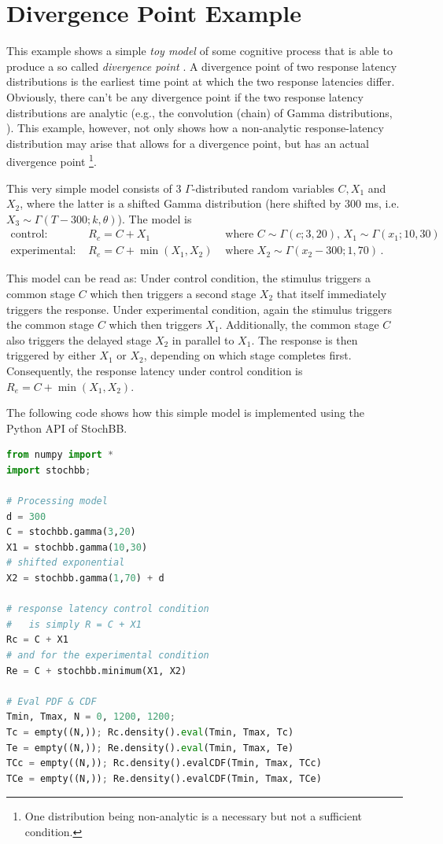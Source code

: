 \section{Divergence Point Example}
This example shows a simple \emph{toy model} of some cognitive process that is able to produce a
so called \emph{divergence point} \cite{Reingold2012}. A divergence point of two response latency
distributions is the earliest time point at which the two response latencies differ. Obviously, 
there can't be any divergence point if the two response latency distributions are analytic 
(e.g., the convolution (chain) of Gamma distributions, \cite{Gelooven1999}). This example, however,
not only shows how a non-analytic response-latency distribution may arise that allows for a 
divergence point, but has an actual divergence point%
\footnote{One distribution being non-analytic is a necessary but not a sufficient condition.}. 

This very simple model consists of 3 $\Gamma$-distributed random variables $C, X_1$ and $X_2$,
where the latter is a shifted Gamma distribution (here shifted by $300$ ms, i.e. 
$X_3 \sim \Gamma(T-300; k, \theta)$).  The model is
\begin{align}
 \text{control: } & R_c = C + X_1 & \text{ where } C \sim \Gamma(c; 3, 20),\,X_1\sim\Gamma(x_1; 10,30)\\
 \text{experimental: } & R_e = C + \min(X_1, X_2) & \text{ where } X_2 \sim\Gamma(x_2-300; 1, 70)\,.
\end{align}

This model can be read as: Under control condition, the stimulus triggers a common stage $C$ which then 
triggers a second stage $X_2$ that itself immediately triggers the response. Under experimental condition,
again the stimulus triggers the common stage $C$ which then triggers $X_1$. Additionally, the common
stage $C$ also triggers the delayed stage $X_2$ in parallel to $X_1$. The response is then triggered by 
either $X_1$ or $X_2$, depending on which stage completes first. Consequently, the response latency
under control condition is $R_e = C + \min(X_1,X_2)$.

The following code shows how this simple model is implemented using the Python API of StochBB.

\begin{lstlisting}[language=Python]
from numpy import *
import stochbb;

# Processing model
d = 300
C = stochbb.gamma(3,20)
X1 = stochbb.gamma(10,30)
# shifted exponential
X2 = stochbb.gamma(1,70) + d

# response latency control condition
#   is simply R = C + X1
Rc = C + X1
# and for the experimental condition
Re = C + stochbb.minimum(X1, X2)

# Eval PDF & CDF
Tmin, Tmax, N = 0, 1200, 1200;
Tc = empty((N,)); Rc.density().eval(Tmin, Tmax, Tc)
Te = empty((N,)); Re.density().eval(Tmin, Tmax, Te)
TCc = empty((N,)); Rc.density().evalCDF(Tmin, Tmax, TCc)
TCe = empty((N,)); Re.density().evalCDF(Tmin, Tmax, TCe)
\end{lstlisting}

